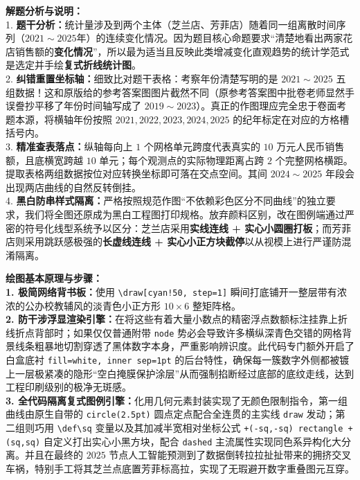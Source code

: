 {\small\color{gray}
\textbf{解题分析与说明：}\\
1. \textbf{题干分析：}统计量涉及到两个主体（芝兰店、芳菲店）随着同一组离散时间序列（$2021\sim 2025$年）的连续变化情况。因为题目核心命题要求“清楚地看出两家花店销售额的\textbf{变化情况}”，所以最为适当且反映此类增减变化直观趋势的统计学范式是选定并手绘\textbf{复式折线统计图}。\\
2. \textbf{纠错重置坐标轴：}细致比对题干表格：考察年份清楚写明的是 $2021\sim 2025$ 五组数据！这和原版给的参考答案图图片截然不同（原参考答案图中批卷老师显然手误誊抄平移了年份时间轴写成了 $2019\sim 2023$）。真正的作图理应完全忠于卷面考题本源，将横轴年份按照 $2021, 2022, 2023, 2024, 2025$ 的纪年标定在对应的方格槽括号内。\\
3. \textbf{精准查表落点：}纵轴每向上 $1$ 个网格单元跨度代表真实的 $10$ 万元人民币销售额，且底横宽跨越 $10$ 单元；每个观测点的实际物理距离占跨 $2$ 个完整网格横距。提取表格两组数据按位对应转换坐标即可落在交点空间。其间 $2024\sim 2025$ 年段会出现两店曲线的自然反转倒挂。\\
4. \textbf{黑白防串样式隔离：}严格按照规范作图“不依赖彩色区分不同曲线”的独立要求，我们将全图还原成为黑白工程图打印规格。放弃颜料区别，改在图例端通过严密的符号化线型系统予以区分：芝兰店采用\textbf{实线连线 + 实心小圆圈打板}；而芳菲店则采用跳跃感极强的\textbf{长虚线连线 + 实心小正方块截停}以从视模上进行严谨防混淆隔离。
}

\vspace{0.6cm}

{\small\color{blue!70!black}
\textbf{绘图基本原理与步骤：}\\
\textbf{1. 极简网络背书板：}使用 \texttt{\textbackslash draw[cyan!50, step=1]} 瞬间打底铺开一整层带有浓浓的公办校教辅风的淡青色小正方形 $10\times 6$ 整矩阵格。\\
\textbf{2. 防干涉浮显渲染引擎：}在将这些有着大量小数点的精密浮点数额标注挂靠上折线折点背部时；如果仅仅普通附带 \texttt{node} 势必会导致许多横纵深青色交错的网格背景线条粗暴地切割穿透了黑体数字本身，严重影响辨识度。此代码专门额外开启了白盒底衬 \texttt{fill=white, inner sep=1pt} 的后台特性，确保每一簇数字外侧都被镀上一层极紧凑的隐形“空白掩膜保护涂层”从而强制掐断经过底部的底纹走线，达到工程印刷级别的极净无斑感。\\
\textbf{3. 全代码隔离复式图例引擎：}化用几何元素封装实现了无颜色限制指令，第一组曲线由原生自带的 \texttt{circle(2.5pt)} 圆点定点配合全连贯的主实线 \texttt{draw} 发动；第二组则巧用 \texttt{\textbackslash def\textbackslash sq} 变量以及其加减半宽相对坐标公式 \texttt{+(-sq,-sq) rectangle +(sq,sq)} 自定义打出实心小黑方块，配合 \texttt{dashed} 主流属性实现同色系异构化大分离。并且在最终的 $2025$ 节点人工智能预测到了数据倒转拉拉扯扯带来的拥挤交叉车祸，特别手工将其芝兰点底置芳菲标高拉，实现了无瑕避开数字重叠图元互穿。
}


